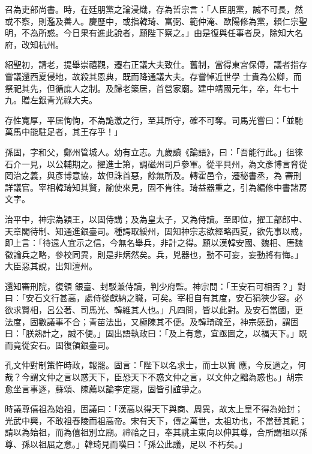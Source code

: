 \begin{pinyinscope}
 召為吏部尚書。時，在廷朋黨之論浸熾，存為哲宗言：「人臣朋黨，誠不可長，然或不察，則濫及善人。慶歷中，或指韓琦、富弼、範仲淹、歐陽修為黨，賴仁宗聖明，不為所惑。今日果有進此說者，願陛下察之。」由是復與任事者戾，除知大名府，改知杭州。



 紹聖初，請老，提舉崇禧觀，遷右正議大夫致仕。舊制，當得東宮保傅，議者指存嘗議還西夏侵地，故殺其恩典，既而降通議大夫。存嘗悼近世學
 士貴為公卿，而祭祀其先，但循庶人之制。及歸老築居，首營家廟。建中靖國元年，卒，年七十九。贈左銀青光祿大夫。



 存性寬厚，平居恂恂，不為詭激之行，至其所守，確不可奪。司馬光嘗曰：「並馳萬馬中能駐足者，其王存乎！」



 孫固，字和父，鄭州管城人。幼有立志。九歲讀《論語》，曰：「吾能行此。」徂徠石介一見，以公輔期之。擢進士第，調磁州司戶參軍。從平貝州，為文彥博言脅從罔治之義，與彥博意協，故但誅首惡，餘無所及。轉霍邑令，遷秘書丞，為
 審刑詳議官。宰相韓琦知其賢，諭使來見，固不肯往。琦益器重之，引為編修中書諸房文字。



 治平中，神宗為穎王，以固侍講；及為皇太子，又為侍讀。至即位，擢工部郎中、天章閣待制、知通進銀臺司。種諤取綏州，固知神宗志欲經略西夏，欲先事以戒，即上言：「待遠人宜示之信，今無名舉兵，非計之得。願以漢韓安國、魏相、唐魏徵論兵之略，參校同異，則是非炳然矣。兵，兇器也，動不可妄，妄動將有悔。」大臣惡其說，出知澶州。



 還知審刑院，復領
 銀臺、封駁兼侍讀，判少府監。神宗問：「王安石可相否？」對曰：「安石文行甚高，處侍從獻納之職，可矣。宰相自有其度，安石狷狹少容。必欲求賢相，呂公著、司馬光、韓維其人也。」凡四問，皆以此對。及安石當國，更法度，固數議事不合；青苗法出，又極陳其不便。及韓琦疏至，神宗感動，謂固曰：「朕熟計之，誠不便。」固出語執政曰：「及上有意，宜亟圖之，以福天下。」既而竟從安石。固復領銀臺司。



 孔文仲對制策忤時政，報罷。固言：「陛下以名求士，而士以實
 應，今反過之，何哉？今謂文仲之言以惑天下，臣恐天下不惑文仲之言，以文仲之黜為惑也。」胡宗愈坐言事逐，蘇頌、陳薦以論李定罷，固皆引誼爭之。



 時議尊僖祖為始祖，固議曰：「漢高以得天下與商、周異，故太上皇不得為始封；光武中興，不敢祖舂陵而祖高帝。宋有天下，傳之萬世，太祖功也，不當替其祀；請以為始祖，而為僖祖別立廟。禘祫之日，奉其祧主東向以伸其尊，合所謂祖以孫尊、孫以祖屈之意。」韓琦見而嘆曰：「孫公此議，足以
 不朽矣。」




\end{pinyinscope}
